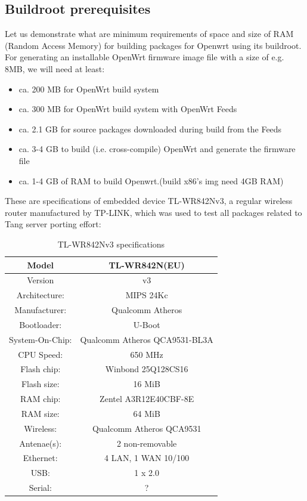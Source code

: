 \subsection{Buildroot prerequisites}

Let us demonstrate what are minimum requirements of space and size of RAM (Random Access Memory) for building packages for Openwrt using its buildroot.
For generating an installable OpenWrt firmware image file with a size of e.g. 8MB, we will need at least:
\begin{itemize}
\item ca. 200 MB for OpenWrt build system
\item ca. 300 MB for OpenWrt build system with OpenWrt Feeds
\item ca. 2.1 GB for source packages downloaded during build from the Feeds
\item ca. 3-4 GB to build (i.e. cross-compile) OpenWrt and generate the firmware file
\item ca. 1-4 GB of RAM to build Openwrt.(build x86's img need 4GB RAM)
\end{itemize}

These are specifications of embedded device TL-WR842Nv3, a regular wireless router manufactured by TP-LINK, which was used to test all packages related to Tang server porting effort:

\begin{table}[h]
\centering
\label{routerspec}
\begin{tabular}{c|c}
\hline
Model           &   TL-WR842N(EU)                   \\ \hline
Version         &   v3                              \\ \hline
Architecture:   &   MIPS 24Kc                       \\ \hline
Manufacturer:   &   Qualcomm Atheros                \\ \hline
Bootloader:     &   U-Boot                          \\ \hline
System-On-Chip: &   Qualcomm Atheros QCA9531-BL3A   \\ \hline
CPU Speed:      &   650 MHz                         \\ \hline
Flash chip:     &   Winbond 25Q128CS16              \\ \hline
Flash size:     &   16 MiB                          \\ \hline
RAM chip:       &   Zentel A3R12E40CBF-8E           \\ \hline
RAM size:       &   64 MiB                          \\ \hline
Wireless:       &   Qualcomm Atheros QCA9531        \\ \hline
Antenae(s):     &   2 non-removable                 \\ \hline
Ethernet:       &   4 LAN, 1 WAN 10/100             \\ \hline
USB:            &   1 x 2.0                         \\ \hline
Serial:         &   ?                               \\ \hline
\end{tabular}
\caption{TL-WR842Nv3 specifications}
\end{table}

